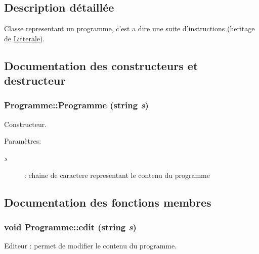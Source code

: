 \subsection{Description détaillée}
Classe representant un programme, c'est a dire une suite d'instructions (heritage de \hyperlink{class_litterale}{Litterale}). 

\subsection{Documentation des constructeurs et destructeur}
\hypertarget{class_programme_714382be5455a92d17099406517df95f}{
\subsubsection[{Programme}]{\setlength{\rightskip}{0pt plus 5cm}Programme::Programme (string {\em s})}}
\label{class_programme_714382be5455a92d17099406517df95f}


Constructeur. 

\begin{Desc}
\item[Paramètres:]
\begin{description}
\item[{\em s}]: chaine de caractere representant le contenu du programme \end{description}
\end{Desc}


\subsection{Documentation des fonctions membres}
\hypertarget{class_programme_db3fc4dc8b2751b3775a53fa245606d2}{
\subsubsection[{edit}]{\setlength{\rightskip}{0pt plus 5cm}void Programme::edit (string {\em s})}}
\label{class_programme_db3fc4dc8b2751b3775a53fa245606d2}


Editeur : permet de modifier le contenu du programme. 

